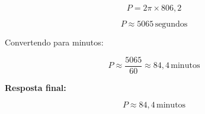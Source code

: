 \documentclass[a4paper,12pt]{article}
\begin{document}
\begin{flushleft}
\begin{equation}
P = 2\pi \times 806{,}2
\end{equation}

\begin{equation}
P \approx 5065 \, \text{segundos}
\end{equation}

Convertendo para minutos:

\begin{equation}
P \approx \frac{5065}{60} \approx 84{,}4 \, \text{minutos}
\end{equation}

\vspace{0.5cm}

\textbf{Resposta final:}

\begin{equation}
\boxed{P \approx 84{,}4 \, \text{minutos}}
\end{equation}

\end{flushleft}
\end{document}

